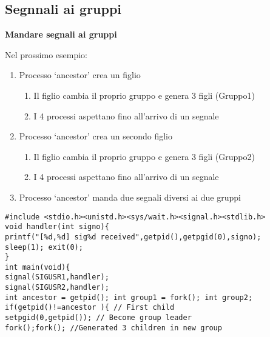 \begin{flushleft}
\begin{flushleft}
    \subsection{Segnnali ai gruppi}
    \begin{flushleft}
      \textbf{Mandare segnali ai gruppi} \par 
      Nel prossimo esempio:
      \begin{enumerate}
        \item Processo ‘ancestor’ crea un figlio
        \begin{enumerate}
          \item Il figlio cambia il proprio gruppo e genera 3 figli (Gruppo1)
          \item I 4 processi aspettano fino all'arrivo di un segnale
        \end{enumerate}
        \item Processo ‘ancestor’ crea un secondo figlio
        \begin{enumerate}
          \item Il figlio cambia il proprio gruppo e genera 3 figli (Gruppo2)
          \item I 4 processi aspettano fino all’arrivo di un segnale
        \end{enumerate}
        \item Processo ‘ancestor’ manda due segnali diversi ai due gruppi
      \end{enumerate}
      \texttt{\#include <stdio.h><unistd.h><sys/wait.h><signal.h><stdlib.h>\\
      void handler(int signo)\{\\
      \halftab printf("[\%d,\%d] sig\%d received\n",getpid(),getpgid(0),signo); \\
      \halftab sleep(1); exit(0);\\
      \}\\
      int main(void)\{ \\
      \halftab signal(SIGUSR1,handler);\\
      \halftab signal(SIGUSR2,handler);\\
      \halftab int ancestor = getpid(); int group1 = fork(); int group2; \\
      \halftab if(getpid()!=ancestor )\{ // First child \\
      \tab setpgid(0,getpid()); // Become group leader\\
      \tab fork();fork(); //Generated 3 children in new group\\
}
\end{flushleft}
\end{flushleft}
\end{flushleft}
